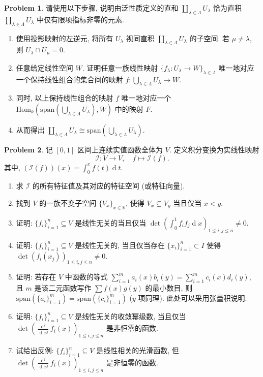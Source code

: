 \documentclass{MainStyle}
\theoremstyle{definition}
\newtheorem{problem}{Problem}
\begin{document}
\begin{problem}
请使用以下步骤, 说明由泛性质定义的直和 $\coprod_{\lambda\in \Lambda} U_\lambda$ 恰为直积 $\prod_{\lambda\in \Lambda} U_\lambda$ 中仅有限项指标非零的元素.
\begin{enumerate}
    \item 使用投影映射的左逆元, 将所有 $U_\lambda$ 视同直积 $\coprod_{\lambda\in \Lambda} U_\lambda$ 的子空间. 若 $\mu\neq \lambda$, 则 $U_\lambda\cap U_\mu=0$.
    \item 任意给定线性空间 $W$. 证明任意一族线性映射 $\{f_\lambda:U_\lambda \to W\}_{\lambda\in \Lambda}$ 唯一地对应一个保持线性组合的集合间的映射 $f:\bigcup_{\lambda\in \Lambda}U_\lambda \to W$.
    \item 同时, 以上保持线性组合的映射 $f$ 唯一地对应一个 $\mathrm{Hom}_k(\mathrm{span}(\bigcup_{\lambda \in\Lambda}U_\lambda), W)$ 中的映射 $F$.
    \item 从而得出 $\coprod_{\lambda\in \Lambda} U_\lambda\cong \mathrm{span}(\bigcup_{\lambda\in \Lambda}U_\lambda)$.
\end{enumerate}
\end{problem}

\begin{problem}
记 $[0,1]$ 区间上连续实值函数全体为 $V$. 定义积分变换为实线性映射
\begin{equation}
    \mathcal I:V\to V,\quad f\mapsto \mathcal I(f).
\end{equation}
其中, $(\mathcal I(f))(x)=\int_0^x f(t)\operatorname dt$.
\begin{enumerate}
    \item 求 $\mathcal I$ 的所有特征值及其对应的特征空间 (或特征向量).
    \item 找到 $V$ 的一族不变子空间 $\{V_x\}_{x\in \mathbb R}$, 使得 $V_x\subsetneq V_y$ 当且仅当 $x<y$.
    \item 证明: $\{f_i\}_{i=1}^n\subseteq V$ 是线性无关的当且仅当 $\det \left(\int_0^1f_if_j\operatorname dx\right)_{1\leq i,j\leq n}\neq 0$.
    \item 证明: $\{f_i\}_{i=1}^n\subseteq V$ 是线性无关的, 当且仅当存在 $\{x_i\}_{i=1}^n\subset I$ 使得 $\det(f_i(x_j))_{1\leq i,j\leq n}\neq 0$.
    \item 证明: 若存在 $V$ 中函数的等式 $\sum_{i=1}^m a_i(x)b_i(y)=\sum_{i=1}^m c_i(x)d_i(y)$, 且 $m$ 是该二元函数写作 $\sum f(x)g(y)$ 的最小数目, 则 $\mathrm{span}(\{a_i\}_{i=1}^m)=\mathrm{span}(\{c_i\}_{i=1}^m)$ ($y$-项同理). 此处可以采用张量积说明.
    \item 证明: $\{f_i\}_{i=1}^n\subseteq V$ 是线性无关的收敛幂级数, 当且仅当 $\det \left(\frac{\operatorname d^j}{\operatorname dx^j}f_i (x)\right)_{1\leq i,j\leq n}$ 是非恒零的函数.
    \item 试给出反例: $\{f_i\}_{i=1}^n\subseteq V$ 是线性相关的光滑函数, 但 $\det \left(\frac{\operatorname d^j}{\operatorname dx^j}f_i (x)\right)_{1\leq i,j\leq n}$ 是非恒零的函数.
\end{enumerate}
\end{problem}
\end{document}
